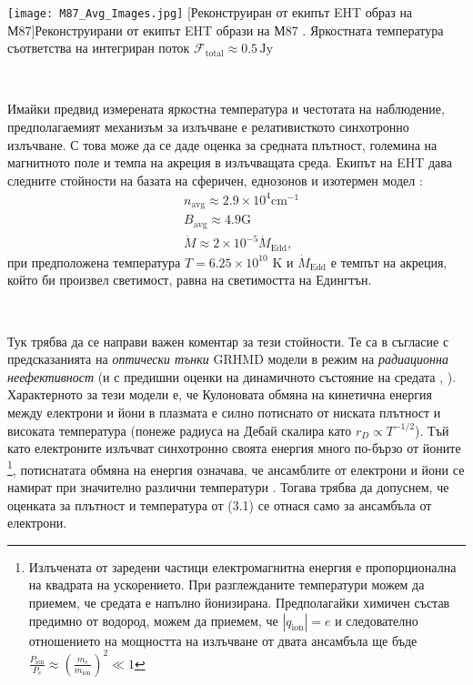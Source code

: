 \noindent\begin{minipage}{15em}
	\centering
	\texttt{[image: М87\_Avg\_Images.jpg]}
	[Реконструиран от екипът EHT образ на М87]{\small Реконструирани от екипът EHT образи на М87 \cite{EHT_M87_I}. Яркостната температура съответства на интегриран поток $\mathcal{F}_{\text{total}}\approx0.5\,\text{Jy}$}
	\label{M87_I_Image}
\end{minipage}\,\,
\begin{minipage}{20em}
	Имайки предвид измерената яркостна температура и честотата на наблюдение, предполагаемият механизъм за излъчване е релативисткото синхотронно излъчване. С това може да се даде оценка за средната плътност, големина на магнитното поле и темпа на акреция в излъчващата среда. Екипът на EHT дава следните стойности на базата на сферичен, еднозонов и изотермен модел \cite{EHT_M87_V}:
	\begin{equation}
		\begin{aligned}
			&n_{\text{avg}} \approx 2.9\times 10^{4} \text{cm}^{-1}\\
			&B_{\text{avg}} \approx 4.9 \text{G}\\
			&\dot{M} \approx 2 \times 10^{-5} \dot{M}_{\text{Edd}},
		\end{aligned}
	\end{equation}
	при предположена температура $T = 6.25\times 10^{10}$ K и $\dot{M}_{\text{Edd}}$ е темпът на акреция, който би произвел светимост, равна на светимостта на Едингтън. 
\end{minipage}\\\newline

Тук трябва да се направи важен коментар за тези стойности. Те са в съгласие с предсказанията на \emph{оптически тънки} GRHMD модели в режим на \emph{радиационна неефективност} (и с предишни оценки на динамичното състояние на средата \cite{Kuo2014}, \cite{Walsh2013}). Характерното за тези модели е, че Кулоновата обмяна на кинетична енергия между електрони и йони в плазмата е силно потиснато от ниската плътност и високата температура (понеже радиуса на Дебай скалира като $r_D \propto T^{-1/2}$). Тъй като електроните излъчват синхотронно своята енергия много по-бързо от йоните \footnote{ Излъчената от заредени частици електромагнитна енергия е пропорционална на квадрата на ускорението. При разглежданите температури можем да приемем, че средата е напълно йонизирана. Предполагайки химичен състав предимно от водород, можем да приемем, че $|q_{\text{ion}}| = e$ и следователно отношението на мощността на излъчване от двата ансамбъла ще бъде $\frac{P_{\text{ion}}}{P_e} \approx \left(\frac{m_e}{m_{\text{ion}}}\right)^2 \ll 1$
}, потиснатата обмяна на енергия означава, че ансамблите от електрони и йони се намират при значително различни температури \cite{Yuan2014}. Тогава трябва да допуснем, че оценката за плътност и температура от (3.1) се отнася само за ансамбъла от електрони.\\

